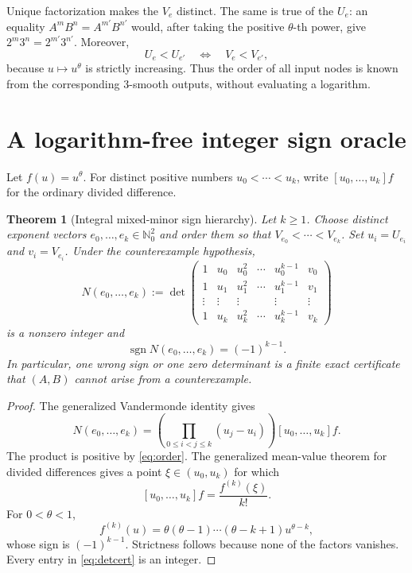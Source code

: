 \documentclass[11pt]{article}
\newtheorem{theorem}{Theorem}[section]
\theoremstyle{definition}
\theoremstyle{remark}
\newcommand{\N}{\mathbb N}
\DeclareMathOperator{\sgn}{sgn}
\begin{document}
Unique factorization makes the $V_e$ distinct.  The same is true of the $U_e$: an equality
$A^mB^n=A^{m'}B^{n'}$ would, after taking the positive $\theta$-th power, give
$2^m3^n=2^{m'}3^{n'}$.  Moreover,
\begin{equation}\label{eq:order}
 U_e<U_{e'}\quad\Longleftrightarrow\quad V_e<V_{e'},
\end{equation}
because $u\mapsto u^\theta$ is strictly increasing.  Thus the order of all input nodes is
known from the corresponding $3$-smooth outputs, without evaluating a logarithm.

\section{A logarithm-free integer sign oracle}

Let $f(u)=u^\theta$.  For distinct positive numbers $u_0<\cdots<u_k$, write
$[u_0,\ldots,u_k]f$ for the ordinary divided difference.

\begin{theorem}[Integral mixed-minor sign hierarchy]\label{thm:signoracle}
Let $k\ge1$.  Choose distinct exponent vectors $e_0,\ldots,e_k\in\N_0^2$ and order them so that
$V_{e_0}<\cdots<V_{e_k}$.  Set $u_i=U_{e_i}$ and $v_i=V_{e_i}$.  Under the
counterexample hypothesis,
\begin{equation}\label{eq:detcert}
 N(e_0,\ldots,e_k):=
 \det\!\begin{pmatrix}
  1&u_0&u_0^2&\cdots&u_0^{k-1}&v_0\\
  1&u_1&u_1^2&\cdots&u_1^{k-1}&v_1\\
  \vdots&\vdots&\vdots&&\vdots&\vdots\\
  1&u_k&u_k^2&\cdots&u_k^{k-1}&v_k
 \end{pmatrix}
\end{equation}
is a nonzero integer and
\begin{equation}\label{eq:signrule}
 \sgn N(e_0,\ldots,e_k)=(-1)^{k-1}.
\end{equation}
In particular, one wrong sign or one zero determinant is a finite exact certificate that
$(A,B)$ cannot arise from a counterexample.
\end{theorem}

\begin{proof}
The generalized Vandermonde identity gives
\[
 N(e_0,\ldots,e_k)=
 \left(\prod_{0\le i<j\le k}(u_j-u_i)\right)[u_0,\ldots,u_k]f.
\]
The product is positive by \eqref{eq:order}.  The generalized mean-value theorem for divided
differences gives a point $\xi\in(u_0,u_k)$ for which
\[
 [u_0,\ldots,u_k]f=\frac{f^{(k)}(\xi)}{k!}.
\]
For $0<\theta<1$,
\[
 f^{(k)}(u)=\theta(\theta-1)\cdots(\theta-k+1)u^{\theta-k},
\]
whose sign is $(-1)^{k-1}$.  Strictness follows because none of the factors vanishes.
Every entry in \eqref{eq:detcert} is an integer.
\end{proof}
\end{document}
